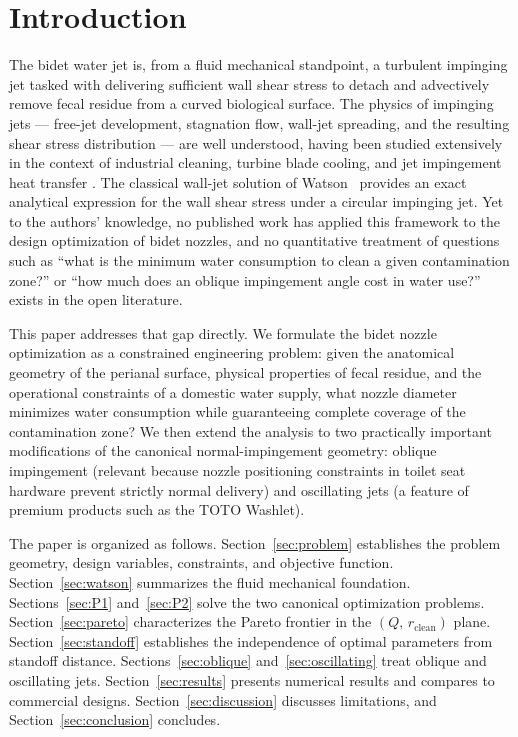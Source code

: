 \documentclass[aps,prfluids,reprint,amsmath,amssymb,floatfix]{revtex4-2}
\begin{document}
\section{Introduction}
\label{sec:intro}

The bidet water jet is, from a fluid mechanical standpoint, a turbulent
impinging jet tasked with delivering sufficient wall shear stress to
detach and advectively remove fecal residue from a curved biological
surface. The physics of impinging jets --- free-jet development, stagnation
flow, wall-jet spreading, and the resulting shear stress distribution ---
are well understood, having been studied extensively in the context of
industrial cleaning, turbine blade cooling, and jet impingement heat transfer
\citep{ZuckermanLior2006}. The classical wall-jet solution of
Watson~\citep{Watson1964} provides an exact analytical expression for the
wall shear stress under a circular impinging jet. Yet to the authors'
knowledge, no published work has applied this framework to the design
optimization of bidet nozzles, and no quantitative treatment of questions
such as ``what is the minimum water consumption to clean a given contamination
zone?'' or ``how much does an oblique impingement angle cost in water use?''
exists in the open literature.

This paper addresses that gap directly. We formulate the bidet nozzle
optimization as a constrained engineering problem: given the anatomical
geometry of the perianal surface, physical properties of fecal residue,
and the operational constraints of a domestic water supply, what nozzle
diameter minimizes water consumption while guaranteeing complete coverage
of the contamination zone? We then extend the analysis to two practically
important modifications of the canonical normal-impingement geometry:
oblique impingement (relevant because nozzle positioning constraints in
toilet seat hardware prevent strictly normal delivery) and oscillating jets
(a feature of premium products such as the TOTO Washlet).

The paper is organized as follows. Section~\ref{sec:problem} establishes
the problem geometry, design variables, constraints, and objective function.
Section~\ref{sec:watson} summarizes the fluid mechanical foundation.
Sections~\ref{sec:P1} and~\ref{sec:P2} solve the two canonical optimization
problems. Section~\ref{sec:pareto} characterizes the Pareto frontier in the
$(Q,\,r_\mathrm{clean})$ plane. Section~\ref{sec:standoff} establishes the
independence of optimal parameters from standoff distance. Sections~\ref{sec:oblique}
and~\ref{sec:oscillating} treat oblique and oscillating jets. Section~\ref{sec:results}
presents numerical results and compares to commercial designs.
Section~\ref{sec:discussion} discusses limitations, and Section~\ref{sec:conclusion}
concludes.
\end{document}
